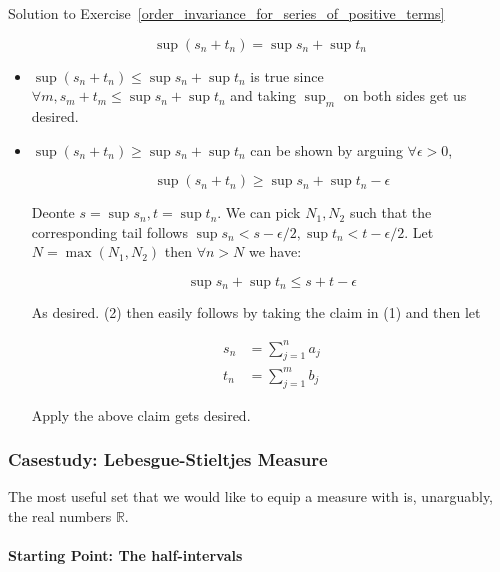 \begin{mystsolution}{Solution to Exercise~\ref{order_invariance_for_series_of_positive_terms}}
\begin{enumerate}
\begin{equation}
\sup(s_n + t_n) = \sup s_n + \sup t_n
\end{equation}
\end{enumerate}

\begin{itemize}
\item $\sup(s_n + t_n) \leq \sup s_n + \sup t_n$ is true since $\forall m, s_m + t_m \leq \sup s_n + \sup t_n$ and taking $\sup_m$ on both sides get us desired.
\item $\sup(s_n + t_n) \geq \sup s_n + \sup t_n$ can be shown by arguing $\forall \epsilon > 0$,

\begin{equation}
\sup(s_n + t_n) \geq \sup s_n + \sup t_n - \epsilon
\end{equation}


Deonte $s=\sup s_n, t = \sup t_n$. We can pick $N_1, N_2$ such that the corresponding tail follows $\sup s_n < s - \epsilon/2, \sup t_n < t - \epsilon /2$. Let $N=\max(N_1,N_2)$ then $\forall n > N$ we have:

\begin{equation}
\sup s_n + \sup t_n \leq  s + t - \epsilon
\end{equation}


As desired. (2) then easily follows by taking the claim in (1) and then let

\begin{equation}
\begin{aligned}
s_n &=\sum_{j=1}^n a_j \\
t_n &=\sum_{j=1}^m b_j
\end{aligned}
\end{equation}


Apply the above claim gets desired.
\end{itemize}

\end{mystsolution}
\subsubsection{Casestudy: Lebesgue-Stieltjes Measure}

The most useful set that we would like to equip a measure with is, unarguably, the real numbers $\mathbb{R}$.

\paragraph{Starting Point: The half-intervals}

